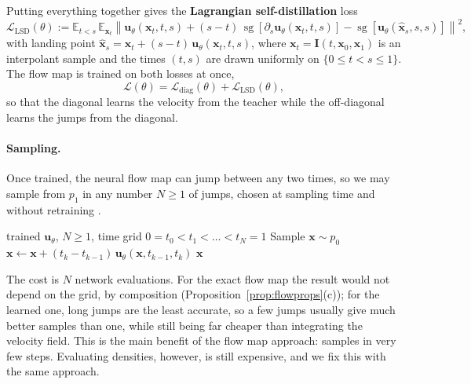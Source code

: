 \documentclass[11pt,a4paper]{article}
\numberwithin{equation}{section}     %
\theoremstyle{plain}        %
\theoremstyle{definition}   %
\theoremstyle{remark}       %
\begin{document}
Putting everything together gives the \textbf{Lagrangian self-distillation} loss \citep{boffi2025build}
\[
\mathcal{L}_{\mathrm{LSD}}(\theta):=\mathbb{E}_{t<s}\,\mathbb{E}_{\mathbf{x}_t}\left\|\mathbf{u}_\theta(\mathbf{x}_t,t,s)+(s-t)\,\operatorname{sg}\left[\partial_s\mathbf{u}_\theta(\mathbf{x}_t,t,s)\right]-\operatorname{sg}\left[\mathbf{u}_\theta(\hat{\mathbf{x}}_s,s,s)\right]\right\|^2,
\]
with landing point $\hat{\mathbf{x}}_s=\mathbf{x}_t+(s-t)\,\mathbf{u}_\theta(\mathbf{x}_t,t,s)$, where $\mathbf{x}_t=\mathbf{I}(t,\mathbf{x}_0,\mathbf{x}_1)$ is an interpolant sample and the times $(t,s)$ are drawn uniformly on $\{0\le t<s\le1\}$. The flow map is trained on both losses at once,
\[
\mathcal{L}(\theta)=\mathcal{L}_{\mathrm{diag}}(\theta)+\mathcal{L}_{\mathrm{LSD}}(\theta),
\]
so that the diagonal learns the velocity from the teacher while the off-diagonal learns the jumps from the diagonal.

\paragraph{Sampling.} Once trained, the neural flow map can jump between any two times, so we may sample from $p_1$ in any number $N\ge1$ of jumps, chosen at sampling time and without retraining \citep{boffi2025build,ouyang2026}.

\begin{algorithm}[htbp]
\caption{Sampling with a neural flow map in $N$ jumps}\label{alg:flowsample}
\begin{algorithmic}[1]
\Require trained $\mathbf{u}_\theta$, $N\ge1$, time grid $0=t_0<t_1<\dots<t_N=1$ 
\State Sample $\mathbf{x}\sim p_0$
\State $\mathbf{x}\gets\mathbf{x}+(t_k-t_{k-1})\,\mathbf{u}_\theta(\mathbf{x},t_{k-1},t_k)$ 
\EndFor
\State \Return $\mathbf{x}$ 
\end{algorithmic}
\end{algorithm}

The cost is $N$ network evaluations. For the exact flow map the result would not depend on the grid, by composition (Proposition~\ref{prop:flowprops}(c)); for the learned one, long jumps are the least accurate, so a few jumps usually give much better samples than one, while still being far cheaper than integrating the velocity field. This is the main benefit of the flow map approach: samples in very few steps. Evaluating densities, however, is still expensive, and we fix this with the same approach.
\end{document}
